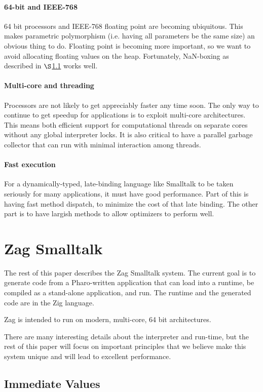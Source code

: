 \documentclass[
]{ceurart}
\def\secref{$\S$\ref}
\begin{document}
\paragraph{64-bit and IEEE-768}
64 bit processors and IEEE-768 floating point are becoming ubiquitous.
This makes parametric polymorphism (i.e. having all parameters be the same size) an obvious thing to do.
Floating point is becoming more important, so we want to avoid allocating floating values on the heap.
Fortunately, NaN-boxing as described in \secref{immediate-values} works well.
\paragraph{Multi-core and threading}
Processors are not likely to get appreciably faster any time soon.
The only way to continue to get speedup for applications is to exploit multi-core architectures.
This means both efficient support for computational threads on separate cores without any global interpreter locks.
It is also critical to have a parallel garbage collector that can run with minimal interaction among threads.
\paragraph{Fast execution}
For a dynamically-typed, late-binding language like Smalltalk to be taken seriously for many applications, it must have good performance.
Part of this is having fast method dispatch, to minimize the cost of that late binding.
The other part is to have largish methods to allow optimizers to perform well.

\section{Zag Smalltalk}

The rest of this paper describes the Zag Smalltalk system.
The current goal is to generate code from a Pharo-written application that can load into a runtime, be compiled as a stand-alone application, and run.
The runtime and the generated code are in the Zig language\cite{zig-lang}.

Zag is intended to run on modern, multi-core, 64 bit architectures.

There are many interesting details about the interpreter and run-time, but the rest of this paper will focus on important principles that we believe make this system unique and will lead to excellent performance.

\subsection{Immediate Values}\label{immediate-values}
\end{document}

